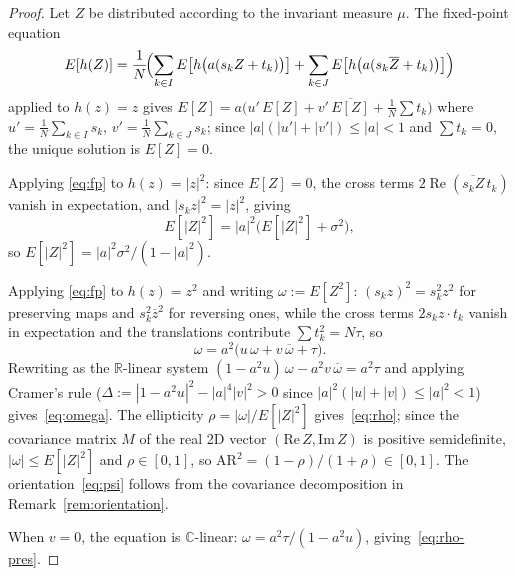 \documentclass[10pt,a4paper]{amsart}
\begin{document}
\begin{proof}
Let $Z$ be distributed according to the invariant measure $\mu$.
The fixed-point equation
\begin{equation}\label{eq:fp}
  E[h(Z)] = \frac{1}{N}\!\Bigl(
    \sum_{k\in I} E\bigl[h\bigl(a(s_k Z + t_k)\bigr)\bigr]
    + \sum_{k\in J} E\bigl[h\bigl(a(s_k\overline{Z} + t_k)\bigr)\bigr]
  \Bigr)
\end{equation}
applied to $h(z)=z$ gives
$E[Z] = a\bigl(u'\,E[Z] + v'\,\overline{E[Z]}
  + \tfrac{1}{N}\!\sum t_k\bigr)$
where $u' = \frac{1}{N}\sum_{k\in I}s_k$,
$v' = \frac{1}{N}\sum_{k\in J}s_k$;
since $|a|(|u'|+|v'|)\leq|a|<1$ and $\sum t_k = 0$,
the unique solution is $E[Z]=0$.

Applying \eqref{eq:fp} to $h(z)=|z|^2$:
since $E[Z]=0$, the cross terms $2\operatorname{Re}(\overline{s_k Z}\,t_k)$
vanish in expectation, and $|s_k z|^2 = |z|^2$, giving
\[
  E[|Z|^2] = |a|^2\bigl(E[|Z|^2] + \sigma^2\bigr),
\]
so $E[|Z|^2] = |a|^2\sigma^2/(1-|a|^2)$.

Applying \eqref{eq:fp} to $h(z)=z^2$ and writing $\omega := E[Z^2]$:
$(s_k z)^2 = s_k^2 z^2$ for preserving maps and
$s_k^2\overline{z}^2$ for reversing ones, while the cross
terms $2s_k z\cdot t_k$ vanish in expectation
and the translations contribute $\sum t_k^2 = N\tau$, so
\begin{equation}\label{eq:omega-fp}
  \omega = a^2\bigl(u\,\omega + v\,\overline{\omega} + \tau\bigr).
\end{equation}
Rewriting as the $\mathbb{R}$-linear system
$(1-a^2 u)\,\omega - a^2 v\,\overline{\omega} = a^2\tau$
and applying Cramer's rule
($\Delta := |1-a^2 u|^2 - |a|^4|v|^2 > 0$
since $|a|^2(|u|+|v|)\leq |a|^2 < 1$)
gives~\eqref{eq:omega}.
The ellipticity
$\rho = |\omega|/E[|Z|^2]$ gives~\eqref{eq:rho};
since the covariance matrix $M$ of the real 2D vector
$(\mathrm{Re}\,Z,\mathrm{Im}\,Z)$ is positive semidefinite,
$|\omega|\leq E[|Z|^2]$ and $\rho\in[0,1]$, so
$\mathrm{AR}^2 = (1-\rho)/(1+\rho)\in[0,1]$.
The orientation~\eqref{eq:psi} follows from the
covariance decomposition in Remark~\ref{rem:orientation}.

When $v=0$, the equation is $\mathbb{C}$-linear:
$\omega = a^2\tau/(1-a^2 u)$,
giving~\eqref{eq:rho-pres}.
\end{proof}
\end{document}

